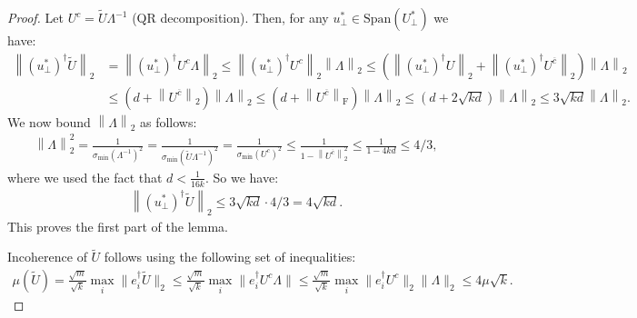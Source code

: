 \documentclass[11pt]{article}
\theoremstyle{plain}
\theoremstyle{definition}
\newcommand{\frob}[1]{\left\| {#1} \right\|_\text{F}}
\newcommand{\twonorm}[1]{\left\| {#1} \right\|_2}
\begin{document}
\begin{proof}
Let $U^c = \widetilde{U}\Lambda^{-1}$ (QR decomposition). Then, for any $u_{\perp}^* \in \textrm{Span}(U_{\perp}^*)$ we have:
\begin{align*}
  \twonorm{\left(u_{\perp}^*\right)^{\dag} \widetilde{U}} &= \twonorm{\left(u_{\perp}^*\right)^{\dag} U^c \Lambda} \leq \twonorm{\left(u_{\perp}^*\right)^{\dag} U^c} \twonorm{\Lambda} \leq \left(\twonorm{\left(u_{\perp}^*\right)^{\dag} U} + \twonorm{\left(u_{\perp}^*\right)^{\dag} U^{\overline{c}} }\right) \twonorm{\Lambda} \\
	&\leq \left(d + \twonorm{ U^{\overline{c}} }\right)\twonorm{\Lambda}
	\leq \left(d + \frob{ U^{\overline{c}} }\right)\twonorm{\Lambda}
	\leq \left(d + 2\sqrt{kd} \right)\twonorm{\Lambda}
	\leq 3\sqrt{kd} \twonorm{\Lambda}.
\end{align*}
We now bound $\twonorm{\Lambda}$ as follows:
\begin{align*}
  \twonorm{\Lambda}^2 = \frac{1}{\sigma_{\textrm{min}}\left(\Lambda^{-1}\right)^2} 
	= \frac{1}{\sigma_{\textrm{min}}\left(\widetilde{U}\Lambda^{-1}\right)^2} 
	= \frac{1}{\sigma_{\textrm{min}}\left(U^c\right)^2} 
	\leq \frac{1}{1 - \twonorm{U^{\overline{c}}}^2} 
	\leq \frac{1}{1 - 4kd} \leq 4/3,
\end{align*}
where we used the fact that $d < \frac{1}{16k}$.
So we have:
\begin{align*}
  \twonorm{\left(u_{\perp}^*\right)^{\dag} \widetilde{U}} \leq  3 \sqrt{kd} \cdot 4/3 = 4\sqrt{kd}.
\end{align*}
This proves the first part of the lemma.

Incoherence of $\widetilde{U}$ follows using the following set of inequalities: 
\begin{align*}
\mu(\widetilde{U})=\frac{\sqrt{m}}{\sqrt{k}}\max_i \|e_i^\dag \widetilde{U}\|_2 \leq \frac{\sqrt{m}}{\sqrt{k}}\max_i \|e_i^\dag U^c \Lambda\| \leq \frac{\sqrt{m}}{\sqrt{k}}\max_i \|e_i^\dag U^c\|_2\|\Lambda\|_2\leq 4\mu \sqrt{k}. 
\end{align*}
\end{proof}
\end{document}
